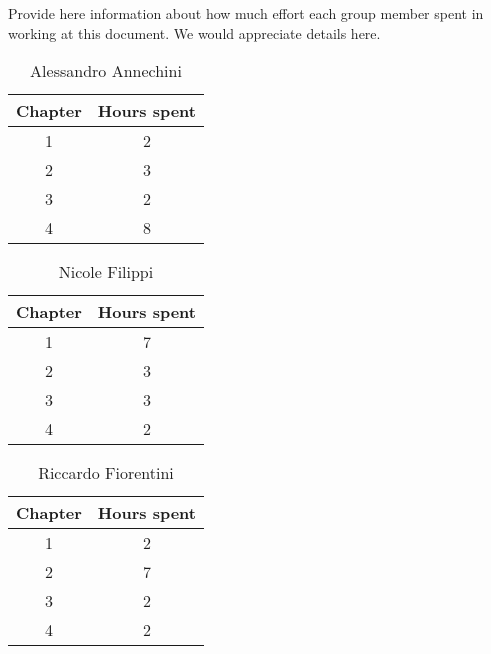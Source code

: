 Provide here information about how much effort each group member spent in working at this document. We would appreciate details here.


\begin{table}[h!]
  \centering
  \begin{tabular}{|c|c|}
    \hline
    Chapter & Hours spent \\
    \hline
    1 & 2\\
    \hline
    2 & 3\\
    \hline
    3 & 2\\
    \hline
    4 & 8\\
    \hline
  \end{tabular}
  \caption{Alessandro Annechini}
  \label{tab:Alessandro_Annechini_hours}
\end{table}

\begin{table}[h!]
  \centering
  \begin{tabular}{|c|c|}
    \hline
    Chapter & Hours spent \\
    \hline
    1 & 7\\
    \hline
    2 & 3\\
    \hline
    3 & 3\\
    \hline
    4 & 2\\
    \hline
  \end{tabular}
  \caption{Nicole Filippi}
  \label{tab:Nicole_Filippi_hours}
\end{table}

\begin{table}[h!]
  \centering
  \begin{tabular}{|c|c|}
    \hline
    Chapter & Hours spent \\
    \hline
    1 & 2\\
    \hline
    2 & 7\\
    \hline
    3 & 2\\
    \hline
    4 & 2\\
    \hline
  \end{tabular}
  \caption{Riccardo Fiorentini}
  \label{tab:Riccardo_Fiorentini_hours}
\end{table}